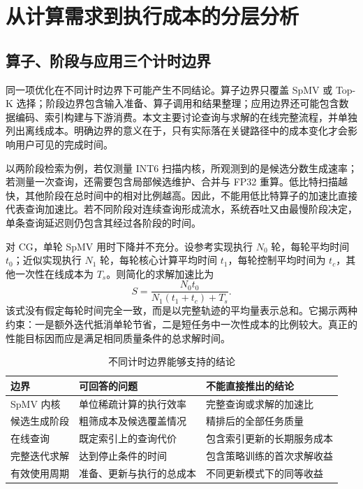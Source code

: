 \section{从计算需求到执行成本的分层分析}
\subsection{算子、阶段与应用三个计时边界}
同一项优化在不同计时边界下可能产生不同结论。算子边界只覆盖 SpMV 或 Top-K 选择；阶段边界包含输入准备、算子调用和结果整理；应用边界还可能包含数据编码、索引构建与下游消费。本文主要讨论查询与求解的在线完整流程，并单独列出离线成本。明确边界的意义在于，只有实际落在关键路径中的成本变化才会影响用户可见的完成时间。

以两阶段检索为例，若仅测量 INT6 扫描内核，所观测到的是候选分数生成速率；若测量一次查询，还需要包含局部候选维护、合并与 FP32 重算。低比特扫描越快，其他阶段在总时间中的相对比例越高。因此，不能用低比特算子的加速比直接代表查询加速比。若不同阶段对连续查询形成流水，系统吞吐又由最慢阶段决定，单条查询延迟则仍包含其经过各阶段的时间。

对 CG，单轮 SpMV 用时下降并不充分。设参考实现执行 $N_0$ 轮，每轮平均时间 $t_0$；近似实现执行 $N_1$ 轮，每轮核心计算平均时间 $t_1$，每轮控制平均时间为 $t_c$，其他一次性在线成本为 $T_s$。则简化的求解加速比为
\begin{equation}
 S=\frac{N_0t_0}{N_1(t_1+t_c)+T_s}.
\end{equation}
该式没有假定每轮时间完全一致，而是以完整轨迹的平均量表示总和。它揭示两种约束：一是额外迭代抵消单轮节省，二是短任务中一次性成本的比例较大。真正的性能目标因而应是满足相同质量条件的总求解时间。

\begin{table}[htbp]\centering\caption{不同计时边界能够支持的结论}
\begin{tabularx}{\textwidth}{p{2.4cm}XX}\toprule
边界&可回答的问题&不能直接推出的结论\\\midrule
SpMV 内核&单位稀疏计算的执行效率&完整查询或求解的加速比\\
候选生成阶段&粗筛成本及候选覆盖情况&精排后的全部任务质量\\
在线查询&既定索引上的查询代价&包含索引更新的长期服务成本\\
完整迭代求解&达到停止条件的时间&包含策略训练的首次求解收益\\
有效使用周期&准备、更新与执行的总成本&不同更新模式下的同等收益\\\bottomrule
\end{tabularx}\end{table}

